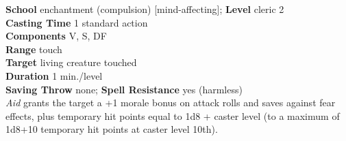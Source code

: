 \textbf{School} enchantment (compulsion) [mind-affecting]; \textbf{Level} cleric 2\\
\textbf{Casting Time} 1 standard action\\
\textbf{Components} V, S, DF\\
\textbf{Range} touch\\
\textbf{Target} living creature touched\\
\textbf{Duration} 1 min./level\\
\textbf{Saving Throw} none;\textbf{ Spell Resistance} yes (harmless) \\
\textit{Aid }grants the target a +1 morale bonus on attack rolls and saves against fear effects, plus temporary hit points equal to 1d8 + caster level (to a maximum of 1d8+10 temporary hit points at caster level 10th).\\

